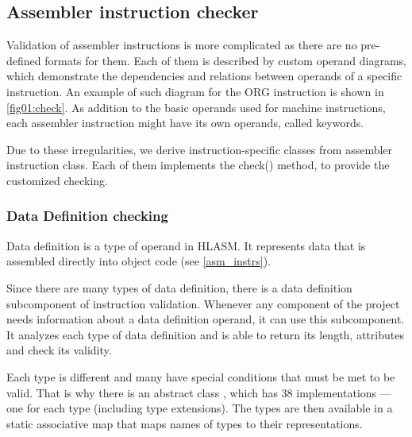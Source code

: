 \subsection{Assembler instruction checker}
\label{sub:asm_check}
Validation of assembler instructions is more complicated as there are no pre-defined formats for them. Each of them is described by custom operand diagrams, which demonstrate the dependencies and relations between operands of a specific instruction. An example of such diagram for the ORG instruction is shown in \cref{fig01:check}. As addition to the basic operands used for machine instructions, each assembler instruction might have its own operands, called keywords.

Due to these irregularities, we derive instruction-specific classes from assembler instruction class. Each of them implements the check() method, to provide the customized checking.

\subsubsection{Data Definition checking}
Data definition is a type of operand in HLASM. It represents data that is assembled directly into object code (see \cref{asm_instrs}).

Since there are many types of data definition, there is a data definition subcomponent of instruction validation. Whenever any component of the project needs information about a data definition operand, it can use this subcomponent. It analyzes each type of data definition and is able to return its length, attributes and check its validity.

Each type is different and many have special conditions that must be met to be valid. That is why there is an abstract class , which has 38 implementations --- one for each type (including type extensions). The types are then available in a static associative map that maps names of types to their representations.


